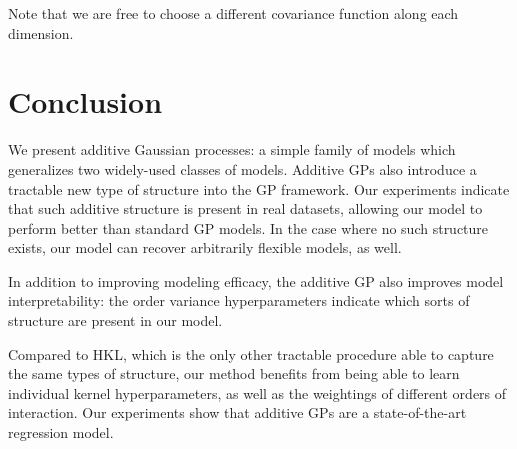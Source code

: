 Note that we are free to choose a different covariance function along each dimension.


\section{Conclusion}

We present additive Gaussian processes: a simple family of models which generalizes two widely-used classes of models.  Additive GPs also introduce a tractable new type of structure into the GP framework.   Our experiments indicate that such additive structure is present in real datasets, allowing our model to perform better than standard GP models.  In the case where no such structure exists, our model can recover arbitrarily flexible models, as well.

In addition to improving modeling efficacy, the additive GP also improves model interpretability:  the order variance hyperparameters indicate which sorts of structure are present in our model.

Compared to HKL, which is the only other tractable procedure able to capture the same types of structure, our method benefits from being able to learn individual kernel hyperparameters, as well as the weightings of different orders of interaction.  Our experiments show that additive GPs are a state-of-the-art regression model.



\outbpdocument{


}







